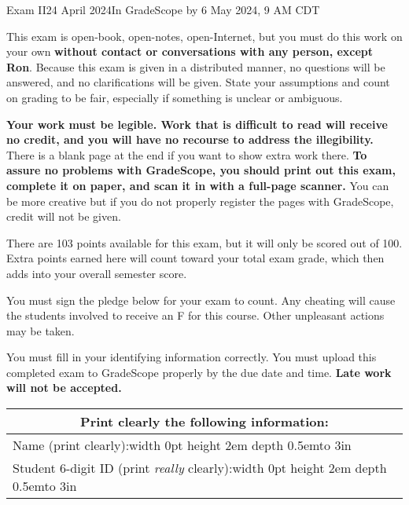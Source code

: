 \documentclass[12pt]{article}
\def\Tall{\vrule width 0pt height 2em depth 0.5em}
\begin{document}
\def\TensOp{\ensuremath{\bm{\otimes}}}
\def\TensProd#1#2{\ensuremath{#1 \TensOp{} #2}}
\def\RootN#1{\RootUN{1}{#1}}
\def\RootUN#1#2{\ensuremath{\frac{#1}{\sqrt{#2}}}}
\def\RootTwo{\RootN{2}}
\def\ExpVal#1#2{\ensuremath{\bra{#2}#1\ket{#2}}}

\begin{assignment}{Exam II}{24 April 2024}{In GradeScope by 6 May 2024, 9 AM CDT}

{\small {\large {}}
This exam is open-book, open-notes, open-Internet, but you must do this
work on your own \textbf{without contact or conversations with any person, except Ron}.  
Because this exam is given in a distributed manner, no questions will be answered, and no clarifications will be given.  State your assumptions and count on grading to be fair, especially if something is unclear or ambiguous.


\textbf{Your work must be legible.  Work that is
difficult to read will receive no credit, and you will have no recourse to address the illegibility.}  There is a blank page at the end
if you want to show extra work there.  \textbf{To assure no problems with GradeScope,
you should
print out this exam, complete it on paper, and scan it in with a full-page
scanner.}  You can be more creative but if you do not properly register the
pages with GradeScope, credit will not be given.

There are 103 points available for this exam, but it will only be scored out of 100.  Extra points earned here will count toward your total exam grade, which then adds into your overall semester score.

You must sign the pledge below for your exam to count.  Any cheating will
cause the students involved to receive an F for this course. Other unpleasant
actions
may be taken.

You must fill in your identifying information correctly.  You must upload this
completed exam to GradeScope properly by the due date and time.  \textbf{Late work will not be accepted.}
}

\begin{center}\large
\begin{tabular}{|c|c|c|} \hline
\multicolumn{3}{|c|}{{\bf Print  clearly} the following information:}  \\ \hline
\multicolumn{3}{|l|}{Name (print clearly):\Tall{}\hbox to 3in{\hss}}  \\ \hline
\multicolumn{3}{|l|}{Student 6-digit ID (print {\it really} clearly):\Tall{}\hbox to 3in{\hss}} \\ \hline
\end{tabular}
\end{center}


\end{assignment}
\end{document}
